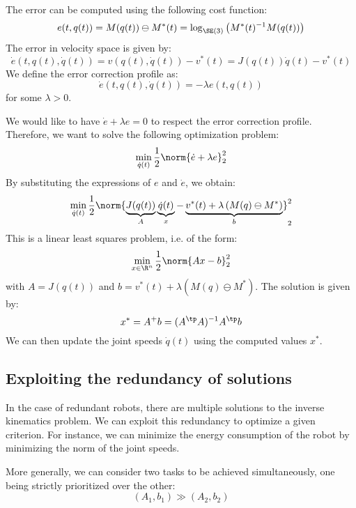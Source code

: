 The error can be computed using the following cost function:
\begin{equation*}
    e(t, q(t)) = M(q(t)) \ominus M^*(t) = \log_{\SE(3)}\left(M^*(t)^{-1}M(q(t))\right)
\end{equation*}
The error in velocity space is given by:
\begin{equation*}
    \dot{e}(t, q(t), \dot{q}(t)) = v(q(t), \dot{q}(t)) - v^*(t) = J(q(t))\dot{q}(t) - v^*(t)
\end{equation*}
We define the error correction profile as:
\begin{equation*}
    \dot{e}(t, q(t), \dot{q}(t)) = -\lambda e(t, q(t))
\end{equation*}
for some $\lambda>0$. 

We would like to have $\dot{e}+\lambda e=0$ to respect the error correction profile. Therefore, we want to solve the following optimization problem:
\begin{equation}
    \min_{\dot{q}(t)} \frac{1}{2}\norm{\dot{e}+\lambda e}_2^2
\end{equation}
By substituting the expressions of $e$ and $\dot{e}$, we obtain:
\begin{equation*}
    \min_{\dot{q}(t)} \frac{1}{2}\norm{
        \underbrace{J(q(t))}_{A}\underbrace{\dot{q}(t)}_{x} - \underbrace{v^*(t) + \lambda\left(M(q)\ominus M^*\right)}_{b}
    }_2^2
\end{equation*}
This is a linear least squares problem, i.e. of the form:
\begin{equation*}
    \min_{x\in\R^n}\frac{1}{2}\norm{Ax-b}_2^2
\end{equation*}
with $A=J(q(t))$ and $b=v^*(t)+\lambda\left(M(q)\ominus M^*\right)$. The solution is given by:
\begin{equation*}
    x^* = A^+b = (A^\tp A)^{-1}A^\tp b
\end{equation*}
We can then update the joint speeds $\dot{q}(t)$ using the computed values $x^*$.

\subsection{Exploiting the redundancy of solutions}
In the case of redundant robots, there are multiple solutions to the inverse kinematics problem. We can exploit this redundancy to optimize a given criterion. For instance, we can minimize the energy consumption of the robot by minimizing the norm of the joint speeds.

More generally, we can consider two tasks to be achieved simultaneously, one being strictly prioritized over the other:
\begin{equation*}
    (A_1, b_1) \gg (A_2, b_2)
\end{equation*}

